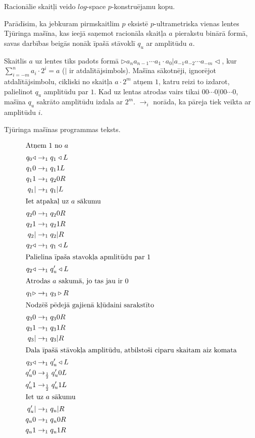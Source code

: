 \documentclass{ludis}
\begin{document}
\begin{teorema}
Racionālie skaitļi veido $log$-space $p$-konstruējamu kopu.
\end{teorema}
\begin{pieradijums}
Parādīsim, ka jebkuram pirmskaitlim $p$ eksistē $p$-ultrametriska vienas lentes Tjūringa mašīna, kas ieejā saņemot racionāla skaitļa $a$ pierakstu binārā formā, savas darbības beigās nonāk īpašā stāvoklī $q_u$ ar amplitūdu $a$.

Skaitlis $a$ uz lentes tiks padots formā $\triangleright a_n a_{n-1} \cdots a_1 \cdot a_0 | a_{-1} a_{-2} \cdots a_{-m} \triangleleft$, kur $\sum\limits_{i=-m}^n a_i \cdot 2^i = a$ ($|$ ir atdalītājsimbols). Mašīna sākotnēji, ignorējot atdalītājsimbolu, cikliski no skaitļa $a \cdot 2^m$ atņem $1$, katru reizi to izdarot, palielinot $q_u$ amplitūdu par $1$. Kad uz lentas atrodas vairs tikai $00 \cdots 0|00 \cdots 0$, mašīna $q_u$ sakrāto amplitūdu izdala ar $2^m$. $\rightarrow_i$ norāda, ka pāreja tiek veikta ar amplitūdu $i$.

Tjūringa mašīnas programmas teksts.
\begin{multicols}{2}
	\begin{align*}
	\shortintertext{Atņem $1$ no $a$}
		q_0\triangleleft & \rightarrow_1 q_1\triangleleft L\\
		q_10 & \rightarrow_1 q_11L\\
		q_11 & \rightarrow_1 q_20R\\
		q_1| & \rightarrow_1 q_1|L\\
	\shortintertext{Iet atpakaļ uz $a$ sākumu}
		q_20 & \rightarrow_1 q_20R\\
		q_21 & \rightarrow_1 q_21R\\
		q_2| & \rightarrow_1 q_2|R\\
		q_2\triangleleft & \rightarrow_1 q_1\triangleleft L\\
	\shortintertext{Palielina īpaša stavokļa apmlitūdu par $1$}
		q_2\triangleleft & \rightarrow_1 q_u'\triangleleft L\\
	\shortintertext{Atrodas $a$ sakumā, jo tas jau ir $0$}
		q_1\triangleright & \rightarrow_1 q_3\triangleright R\\
	\shortintertext{Nodzēš pēdejā gajienā kļūdaini sarakstīto}
		q_30 & \rightarrow_1 q_30R\\
		q_31 & \rightarrow_1 q_31R\\
		q_3| & \rightarrow_1 q_3|R\\
	\shortintertext{Dala īpašā stāvokļa amplitūdu, atbilstoši ciparu skaitam aiz komata}
		q_3\triangleleft & \rightarrow_1 q_u'\triangleleft L\\
		q_u'0 & \rightarrow_\frac{1}{2} q_u'0L\\
		q_u'1 & \rightarrow_\frac{1}{2} q_u'1L\\
	\shortintertext{Iet uz $a$ sākumu}
		q_u'| & \rightarrow_1 q_u|R\\
		q_u0 & \rightarrow_1 q_u0R\\
		q_u1 & \rightarrow_1 q_u1R\\
	\end{align*}
\end{multicols}
\end{pieradijums}
\end{document}
